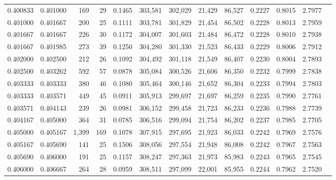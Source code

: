 \begin{tabular}{rrrrrrrrrrrrr}
0.400833 & 0.401000 &   169 &  29 &                                     0.1465 & 303,581 & 302,029 &  21,429 &  86,527 & 0.2227 & 0.8015 & 2.7977 \\
0.401000 & 0.401667 &   200 &  25 &                                     0.1111 & 303,781 & 301,829 &  21,454 &  86,502 & 0.2228 & 0.8013 & 2.7959 \\
0.401667 & 0.401667 &   226 &  30 &                                     0.1172 & 304,007 & 301,603 &  21,484 &  86,472 & 0.2228 & 0.8010 & 2.7938 \\
0.401667 & 0.401985 &   273 &  39 &                                     0.1250 & 304,280 & 301,330 &  21,523 &  86,433 & 0.2229 & 0.8006 & 2.7912 \\
0.402000 & 0.402500 &   212 &  26 &                                     0.1092 & 304,492 & 301,118 &  21,549 &  86,407 & 0.2230 & 0.8004 & 2.7893 \\
0.402500 & 0.403262 &   592 &  57 &                                     0.0878 & 305,084 & 300,526 &  21,606 &  86,350 & 0.2232 & 0.7999 & 2.7838 \\
0.403333 & 0.403333 &   380 &  46 &                                     0.1080 & 305,464 & 300,146 &  21,652 &  86,304 & 0.2233 & 0.7994 & 2.7803 \\
0.403333 & 0.403571 &   449 &  45 &                                     0.0911 & 305,913 & 299,697 &  21,697 &  86,259 & 0.2235 & 0.7990 & 2.7761 \\
0.403571 & 0.404143 &   239 &  26 &                                     0.0981 & 306,152 & 299,458 &  21,723 &  86,233 & 0.2236 & 0.7988 & 2.7739 \\
0.404167 & 0.405000 &   364 &  31 &                                     0.0785 & 306,516 & 299,094 &  21,754 &  86,202 & 0.2237 & 0.7985 & 2.7705 \\
0.405000 & 0.405167 & 1,399 & 169 &                                     0.1078 & 307,915 & 297,695 &  21,923 &  86,033 & 0.2242 & 0.7969 & 2.7576 \\
0.405167 & 0.405690 &   141 &  25 &                                     0.1506 & 308,056 & 297,554 &  21,948 &  86,008 & 0.2242 & 0.7967 & 2.7563 \\
0.405690 & 0.406000 &   191 &  25 &                                     0.1157 & 308,247 & 297,363 &  21,973 &  85,983 & 0.2243 & 0.7965 & 2.7545 \\
0.406000 & 0.406667 &   264 &  28 &                                     0.0959 & 308,511 & 297,099 &  22,001 &  85,955 & 0.2244 & 0.7962 & 2.7520 \\

\end{tabular}
